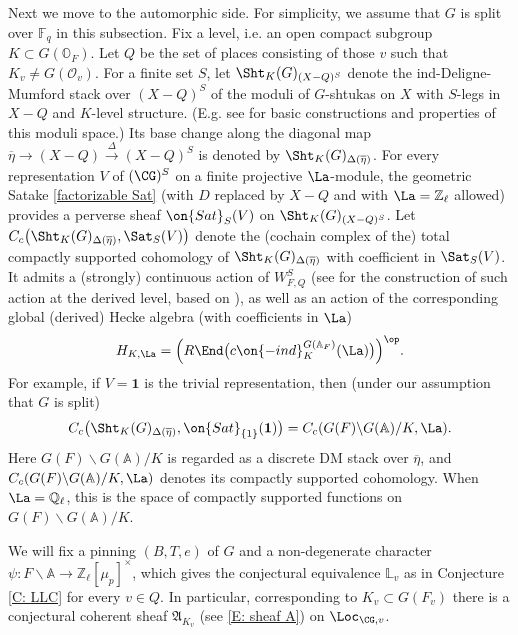 \documentclass[11pt]{amsart}
\theoremstyle{definition}
\theoremstyle{definition}
\theoremstyle{definition}
\numberwithin{equation}{section}
\newcommand{\frakA}{{\mathfrak A}}
\newcommand{\bA}{{\mathbb A}}
\newcommand{\bF}{{\mathbb F}}
\newcommand{\bL}{{\mathbb L}}
\newcommand{\bO}{{\mathbb O}}
\newcommand{\bQ}{{\mathbb Q}}
\newcommand{\bZ}{{\mathbb Z}}
\newcommand{\mO}{{\mathcal O}}
\begin{document}
Next we move to the automorphic side.
For simplicity, we assume that $G$ is split over $\bF_q$ in this subsection. 
Fix a level, i.e. an open compact subgroup $K\subset G(\bO_F)$. Let $Q$ be the set of places consisting of those $v$ such that $K_v\neq G(\mO_v)$.
For a finite set $S$, let $\Sht_K(G)_{(X-Q)^S}$ denote the ind-Deligne-Mumford stack over $(X-Q)^S$ of the moduli of $G$-shtukas on $X$ with $S$-legs in $X-Q$ and $K$-level structure. (E.g. see \cite{Lafforgue-Automorphic-to-Galois} for basic constructions and properties of this moduli space.)
Its base change along the diagonal map $\overline\eta\to (X-Q)\xrightarrow{\Delta}(X-Q)^S$ is denoted by $\Sht_K(G)_{\Delta(\overline\eta)}$. 
For every representation $V$ of $(\CG)^S$ on a finite projective $\La$-module, the geometric Satake \eqref{factorizable Sat} (with $D$ replaced by $X-Q$ and with $\La=\bZ_\ell$ allowed) provides a perverse sheaf $\on{Sat}_S(V)$ on $\Sht_K(G)_{(X-Q)^S}$. 
Let $C_c\bigl(\Sht_K(G)_{\Delta(\overline\eta)},\Sat_S(V)\bigr)$ denote the (cochain complex of the) total compactly supported cohomology of $\Sht_K(G)_{\Delta(\overline\eta)}$ with coefficient in $\Sat_S(V)$. It admits a (strongly) continuous action of $W_{F,Q}^S$ (see \cite{HRS-Kunneth} for the construction of such action at the derived level, based on \cite{Xue-Finiteness, Xue-Smoothness}), as well as an action of the corresponding global (derived) Hecke algebra (with coefficients in $\La$) 
\begin{equation}\label{E: derived hecke global}
H_{K,\La}=\Big(R\End \big(c\on{-ind}_K^{G(\bA_F)}(\La)\big)\Big)^{\op}.
\end{equation}
For example,
if $V=\mathbf{1}$ is the trivial representation, then (under our assumption that $G$ is split)
$$C_c\bigl(\Sht_K(G)_{\Delta(\overline\eta)}, \on{Sat}_{\{1\}}(\mathbf{1})\bigr)= C_c(G(F)\backslash G(\bA)/K,\La).$$
Here $G(F)\backslash G(\bA)/K$ is regarded as a discrete DM stack over $\overline\eta$, and $C_c(G(F)\backslash G(\bA)/K,\La)$ denotes its compactly supported cohomology.
When $\La=\bQ_\ell$, this is the space of compactly supported functions on $G(F)\backslash G(\bA)/K$. 

We will fix a pinning $(B,T,e)$ of $G$ and a non-degenerate character $\psi: F\backslash \bA\to \bZ_\ell[\mu_{p}]^\times$, which gives the conjectural equivalence $\bL_{v}$ as in Conjecture \ref{C: LLC} for every $v\in Q$.  In particular, corresponding to $K_v\subset G(F_v)$ there is a conjectural coherent sheaf $\frakA_{K_v}$ (see \eqref{E: sheaf A}) on $\Loc_{\CG,v}$. 
\end{document}
